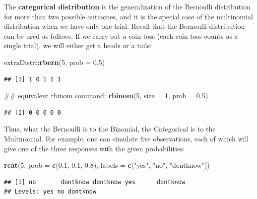 \documentclass[12pt,]{krantz}
\newenvironment{Shaded}{\begin{snugshade}}{\end{snugshade}}
\newcommand{\KeywordTok}[1]{\textcolor[rgb]{0.13,0.29,0.53}{\textbf{#1}}}
\newcommand{\DataTypeTok}[1]{\textcolor[rgb]{0.13,0.29,0.53}{#1}}
\newcommand{\DecValTok}[1]{\textcolor[rgb]{0.00,0.00,0.81}{#1}}
\newcommand{\FloatTok}[1]{\textcolor[rgb]{0.00,0.00,0.81}{#1}}
\newcommand{\StringTok}[1]{\textcolor[rgb]{0.31,0.60,0.02}{#1}}
\newcommand{\OperatorTok}[1]{\textcolor[rgb]{0.81,0.36,0.00}{\textbf{#1}}}
\newcommand{\NormalTok}[1]{#1}
\theoremstyle{definition}
\theoremstyle{definition}
\theoremstyle{definition}
\theoremstyle{remark}
\begin{document}
The \textbf{categorical distribution} is the generalization of the
Bernoulli distribution for more than two possible outcomes, and it is
the special case of the multinomial distribution when we have only one
trial. Recall that the Bernoulli distribution can be used as follows. If
we carry out a coin toss (each coin toss counts as a single trial), we
will either get a heads or a tails:

\begin{Shaded}
\begin{Highlighting}[]
\NormalTok{extraDistr}\OperatorTok{::}\KeywordTok{rbern}\NormalTok{(}\DecValTok{5}\NormalTok{, }\DataTypeTok{prob =} \FloatTok{0.5}\NormalTok{)}
\end{Highlighting}
\end{Shaded}

\begin{verbatim}
## [1] 1 0 1 1 1
\end{verbatim}

\begin{Shaded}
\begin{Highlighting}[]
\NormalTok{## equivalent rbinom command:}
\KeywordTok{rbinom}\NormalTok{(}\DecValTok{5}\NormalTok{, }\DataTypeTok{size =} \DecValTok{1}\NormalTok{, }\DataTypeTok{prob =} \FloatTok{0.5}\NormalTok{)}
\end{Highlighting}
\end{Shaded}

\begin{verbatim}
## [1] 0 0 0 0 0
\end{verbatim}

Thus, what the Bernoulli is to the Binomial, the Categorical is to the
Multinomial. For example, one can simulate five observations, each of
which will give one of the three responses with the given probabilities:

\begin{Shaded}
\begin{Highlighting}[]
\KeywordTok{rcat}\NormalTok{(}\DecValTok{5}\NormalTok{, }\DataTypeTok{prob =} \KeywordTok{c}\NormalTok{(}\FloatTok{0.1}\NormalTok{, }\FloatTok{0.1}\NormalTok{, }\FloatTok{0.8}\NormalTok{), }\DataTypeTok{labels =} \KeywordTok{c}\NormalTok{(}\StringTok{"yes"}\NormalTok{, }\StringTok{"no"}\NormalTok{, }\StringTok{"dontknow"}\NormalTok{))}
\end{Highlighting}
\end{Shaded}

\begin{verbatim}
## [1] no       dontknow dontknow yes      dontknow
## Levels: yes no dontknow
\end{verbatim}
\end{document}
